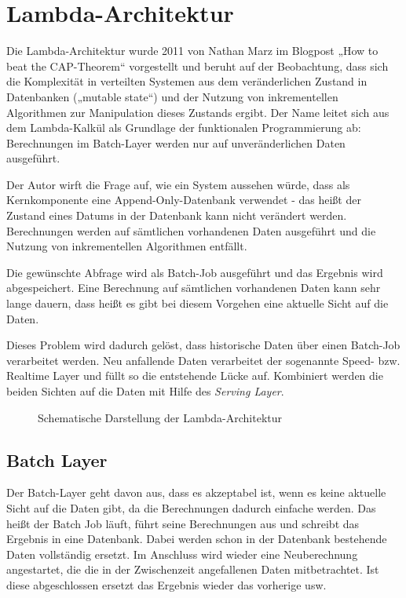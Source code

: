 \documentclass[a4paper,11pt]{scrartcl}
\begin{document}
  \section{Lambda-Architektur}
  Die Lambda-Architektur wurde 2011 von Nathan Marz im Blogpost „How to beat
  the CAP-Theorem“\cite{marz2011} vorgestellt und beruht auf der Beobachtung,
  dass sich die Komplexität in verteilten Systemen aus dem veränderlichen
  Zustand in Datenbanken („mutable state“) und der Nutzung von inkrementellen
  Algorithmen zur Manipulation dieses Zustands ergibt.  Der Name leitet sich
  aus dem Lambda-Kalkül als Grundlage der funktionalen Programmierung ab:
  Berechnungen im Batch-Layer werden nur auf unveränderlichen Daten ausgeführt.

  Der Autor wirft die Frage auf, wie ein System aussehen würde, dass als
  Kernkomponente eine Append-Only-Datenbank verwendet - das heißt der Zustand
  eines Datums in der Datenbank kann nicht verändert werden. Berechnungen werden
  auf sämtlichen vorhandenen Daten ausgeführt und die Nutzung von inkrementellen
  Algorithmen entfällt.

  Die gewünschte Abfrage wird als Batch-Job ausgeführt und das Ergebnis wird
  abgespeichert. Eine Berechnung auf sämtlichen vorhandenen Daten kann sehr
  lange dauern, dass heißt es gibt bei diesem Vorgehen eine aktuelle Sicht auf
  die Daten.

  Dieses Problem wird dadurch gelöst, dass historische Daten über einen Batch-Job
  verarbeitet werden. Neu anfallende Daten verarbeitet der sogenannte Speed- bzw.
  Realtime Layer und füllt so die entstehende Lücke auf. Kombiniert werden
  die beiden Sichten auf die Daten mit Hilfe des \textit{Serving Layer}.

  \begin{figure}[h]
    \center
    \scalebox{.7}{}
    \caption{Schematische Darstellung der Lambda-Architektur}
    \label{fig:lambdaarch}
  \end{figure}

  \subsection{Batch Layer}
  Der Batch-Layer geht davon aus, dass es akzeptabel ist, wenn es keine
  aktuelle Sicht auf die Daten gibt, da die Berechnungen dadurch einfache
  werden.  Das heißt der Batch Job läuft, führt seine Berechnungen aus und
  schreibt das Ergebnis in eine Datenbank. Dabei werden schon in der Datenbank
  bestehende Daten vollständig ersetzt. Im Anschluss wird wieder eine
  Neuberechnung angestartet, die die in der Zwischenzeit angefallenen Daten
  mitbetrachtet. Ist diese abgeschlossen ersetzt das Ergebnis wieder das
  vorherige usw.
\end{document}
